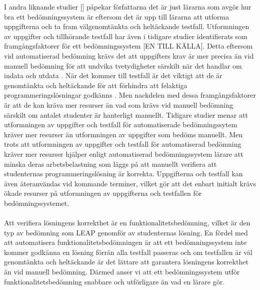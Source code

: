 \documentclass[a4paper,11pt]{article}
\begin{document}
{I andra liknande studier [] påpekar författarna det är just lärarna som avgör hur bra ett bedömningssystem är eftersom det är upp till lärarna att utforma uppgifterna och ta fram välgenomtänkta och heltäckande testfall. Utformningen av uppgifter och tillhörande testfall har även i tidigare studier identifierats som framgångsfaktorer för ett bedömningssystem \cite{hundley-britt-2009} [EN TILL KÄLLA]. Detta eftersom vid automatiserad bedömning krävs det att uppgifters krav är mer precisa än vid manuell bedömning för att undvika tvetydigheter särskilt när det handlar om indata och utdata \cite{douce_11}. När det kommer till testfall är det viktigt att de är genomtänkta och heltäckande för att förhindra att felaktiga programmeringslösningar godkänns \cite{montoya-dato-2009}. Men nackdelen med dessa framgångsfaktorer är att de kan kräva mer resurser än vad som krävs vid manuell bedömning särskilt om antalet studenter är hanterligt manuellt. Tidigare studier \cite{ala-mutka} \cite{cinelli} menar att utformningen av uppgifter och testfall för automatiserade bedömningssytem kräver mer resurser än utformningen av uppgifter som bedöms manuellt. Men trots att utformningen av uppgifter och testfall för automatiserad bedömning kräver mer resurser hjälper enligt \cite{enstrom} automatiserad bedömningssystem lärare att minska deras arbetsbelastning som läggs på att manuellt verifiera att studenternas programmeringslösning är korrekta. Uppgifterna och testfall kan även återanvändas vid kommande terminer, vilket gör att det enbart initialt krävs ökade resurser på utformningen av uppgifterna och testfallen för bedömningssystemet.
\\
\\
Att verifiera lösningens korrekthet är en funktionalitetsbedömning, vilket är den typ av bedömning som LEAP genomför av studenternas lösning. En fördel med att automatisera funktionalitetsbedömningen är att ett bedömningssystem inte kommer godkänna en lösning förrän alla testfall passeras och om testfallen är väl genomtänkta och heltäckande är det lättare att garantera lösningens korrekthet än vid manuell bedömning. Därmed anser vi att ett bedömningssystem utför funktionalitetsbedömning snabbare och utförligare än vad en lärare gör.
\\
\\
}
\end{document}
